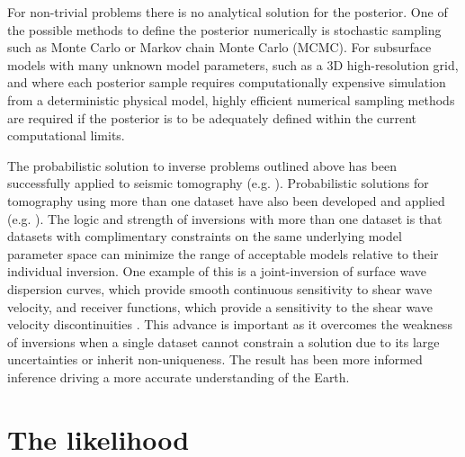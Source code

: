 For non-trivial problems there is no analytical solution for the posterior. One of the possible methods to define the posterior numerically is stochastic sampling such as Monte Carlo or Markov chain Monte Carlo (MCMC). For subsurface models with many unknown model parameters, such as a 3D high-resolution grid, and where each posterior sample requires computationally expensive simulation from a deterministic physical model, highly efficient numerical sampling methods are required if the posterior is to be adequately defined within the current computational limits. \par

The probabilistic solution to inverse problems outlined above has been successfully applied to seismic tomography (e.g. \citet{Sambridge1999,Shapiro2002,Trampert2004,Khan2011}). Probabilistic solutions for tomography using more than one dataset have also been developed  and applied (e.g. \citet{khan2007joint,Moorkamp2010,Bodin2012,Shen2012,afonso2013a,afonso2013b,afonso2016}). The logic and strength of inversions with more than one dataset is that datasets with complimentary constraints on the same underlying model parameter space can minimize the range of acceptable models relative to their individual inversion. One example of this is a joint-inversion of surface wave dispersion curves, which  provide smooth continuous sensitivity to shear wave velocity, and receiver functions, which provide a sensitivity to the shear wave velocity discontinuities \citep{Bodin2012,Shen2012}. This advance is important as it overcomes the weakness of inversions when a single dataset cannot constrain a solution due to its large uncertainties or inherit non-uniqueness. The result has been more informed inference driving a more accurate understanding of the Earth.

\section{The likelihood}


